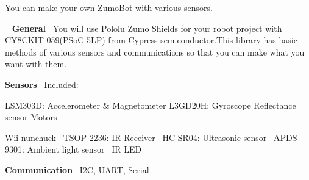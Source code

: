 You can make your own Zumo\+Bot with various sensors.

~\newline
 {\bfseries General}~\newline
 You will use Pololu Zumo Shields for your robot project with C\+Y8\+C\+K\+I\+T-\/059(P\+SoC 5\+LP) from Cypress semiconductor.\+This library has basic methods of various sensors and communications so that you can make what you want with them.

{\bfseries Sensors}~\newline
 Included\+: 
\begin{DoxyPre}    LSM303D: Accelerometer \& Magnetometer
           L3GD20H: Gyroscope
           Reflectance sensor
           Motors\end{DoxyPre}
 Wii nunchuck~\newline
 T\+S\+O\+P-\/2236\+: IR Receiver~\newline
 H\+C-\/\+S\+R04\+: Ultrasonic sensor~\newline
 A\+P\+D\+S-\/9301\+: Ambient light sensor~\newline
 IR L\+ED~\newline


{\bfseries Communication}~\newline
 I2C, U\+A\+RT, Serial~\newline
 